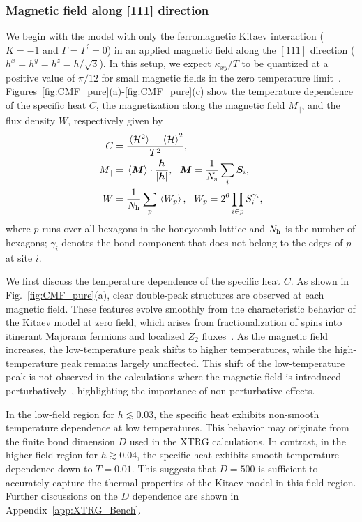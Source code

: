 \documentclass[twocolumn,superscriptaddress,showpacs, longbibliography, aps, prx]{revtex4-2}
\def\vec#1{\boldsymbol #1}
\begin{document}
\subsubsection{Magnetic field along [111] direction}\label{subsec:pureKitaev_h111}
We begin with the model with only the ferromagnetic Kitaev interaction ($K=-1$ and $\Gamma = \Gamma^\prime = 0$) in an applied magnetic field along the $[111]$ direction ($h^x=h^y=h^z=h/\sqrt{3}$). 
In this setup, we expect $\kappa_{xy}/T$ to be quantized at a positive value of $\pi/12$ for small magnetic fields in the zero temperature limit~\cite{Kitaev2006}. 
Figures~\ref{fig:CMF_pure}(a)-\ref{fig:CMF_pure}(c) show the temperature dependence of the specific heat $C$, the magnetization along the magnetic field $M_{\parallel}$, and the flux density $W$, respectively given by
\begin{align}
C&=\frac{\ev*{{\cal H}^{2}}-\ev*{{\cal H}}^2}{T^2}, \label{eq:C}\\
M_{\parallel}&=\ev*{\vec{M}}
\cdot\frac{\vec{h}}{|\vec{h}|},~~\vec{M}=\frac{1}{N_{\rm s}}\sum_{i}\vec{S}_{i}, \label{eq:Mag}\\
W&=\frac{1}{N_{\rm h}}\sum_{p}\ev*{W_{p}}, 
~~W_{p}=2^6\prod_{i\in p}S^{\gamma_{i}}_{i} \label{eq:W},
\end{align}
where $p$ runs over all hexagons in the honeycomb lattice and $N_{\rm h}$ is the number of hexagons; $\gamma_{i}$ denotes the bond component that does not belong to the edges of $p$ at site $i$.

We first discuss the temperature dependence of the specific heat $C$.
As shown in Fig.~\ref{fig:CMF_pure}(a), clear double-peak structures are observed at each magnetic field.
These features evolve smoothly from the characteristic behavior of the Kitaev model at zero field, which arises from fractionalization of spins into itinerant Majorana fermions and localized $Z_2$ fluxes~\cite{NasuUM2014,NasuUM2015}.
As the magnetic field increases, the low-temperature peak shifts to higher temperatures, while the high-temperature peak remains largely unaffected. 
This shift of the low-temperature peak is not observed in the calculations where the magnetic field is introduced perturbatively~\cite{NasuYM2017}, highlighting the importance of non-perturbative effects.

In the low-field region for $h\lesssim 0.03$, the specific heat exhibits non-smooth temperature dependence at low temperatures. 
This behavior may originate from the finite bond dimension $D$ used in the XTRG calculations. 
In contrast, in the higher-field region for $h \gtrsim 0.04$, the specific heat exhibits smooth temperature dependence down to $T=0.01$. 
This suggests that $D=500$ is sufficient to accurately capture the thermal properties of the Kitaev model in this field region. 
Further discussions on the $D$ dependence are shown in Appendix~\ref{app:XTRG_Bench}. 
\end{document}

